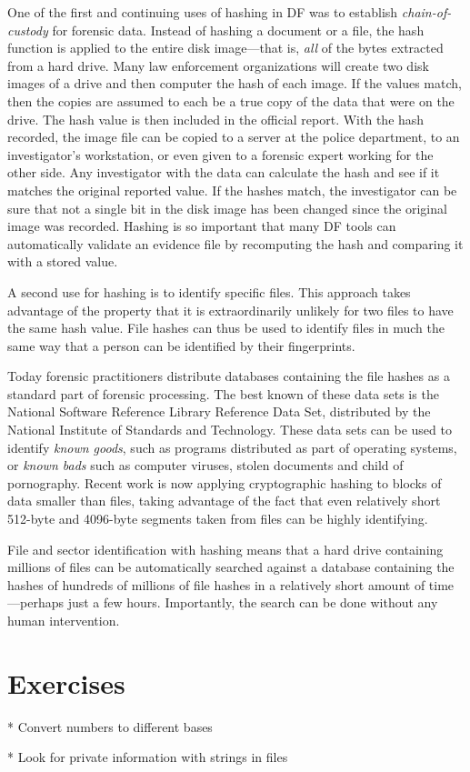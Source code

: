 One of the first and continuing uses of hashing in DF was to establish
\emph{chain-of-custody} for forensic data. Instead of hashing a
document or a file, the hash function is applied to the entire disk
image---that is, \emph{all} of the bytes extracted from a hard
drive. Many law enforcement organizations will create two
disk images of a drive and then computer the hash of each image.  If the values match, then the
copies are assumed to each be a true copy of the data that were on the
drive. The hash value is then included in the official report. With
the hash recorded, the image file can be copied to a server at the
police department, to an investigator's workstation, or even given to
a forensic expert working for the other side. Any investigator with the
data can calculate the hash and see if it matches the original
reported value. If the hashes match, the investigator can be sure that
not a single bit in the disk image has been changed since the original
image was recorded. Hashing is so important that many DF tools can
automatically validate an evidence file by recomputing the hash and
comparing it with a stored value.

A second use for hashing is to identify specific
files. This approach takes advantage of the property that it is
extraordinarily unlikely for two files to have the same
hash value. File hashes can thus be used to identify files in much the
same way that a person can be identified by their fingerprints. 

Today forensic practitioners distribute databases containing the file
hashes as a standard part of forensic processing. The best known of these data
sets is the National Software Reference Library Reference Data Set,
distributed by the National Institute of Standards and
Technology\cite{nist-nsrl-rds-march2012}. These data sets can be used
to identify \emph{known goods}, such as programs distributed as part
of operating systems, or \emph{known bads} such as computer viruses,
stolen documents and child of pornography. Recent work is now
applying cryptographic hashing to blocks of data smaller than
files\cite{garfinkel:sector-id}, taking advantage of the fact that
even relatively short 512-byte and 4096-byte segments taken from
files can be highly identifying. 

File and sector identification with hashing means that a hard drive
containing millions of files can be automatically searched against a
database containing the hashes of hundreds of millions of file hashes
in a relatively short amount of time---perhaps just a few hours. Importantly, the search can be done without any human
intervention.

\section{Exercises}
* Convert numbers to different bases

* Look for private information with strings in files





